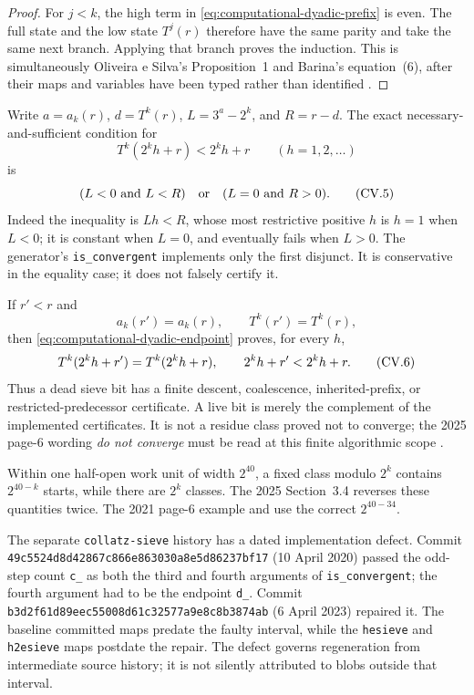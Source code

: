 \begin{proof}
For $j<k$, the high term in \eqref{eq:computational-dyadic-prefix} is even.
The full state and the low state $T^j(r)$ therefore have the same parity and
take the same next branch.  Applying that branch proves the induction.  This
is simultaneously Oliveira e Silva's Proposition~1 and Barina's equation~(6),
after their maps and variables have been typed rather than identified
\cite[p.~191]{OliveiraSilva2010}\cite[p.~5]{Barina2021}.
\end{proof}

Write $a=a_k(r)$, $d=T^k(r)$, $L=3^a-2^k$, and $R=r-d$.  The exact
necessary-and-sufficient condition for
\[
 T^k(2^kh+r)<2^kh+r\qquad(h=1,2,\ldots)
\]
is
\begin{equation}
\stepcounter{equation}
\label{eq:computational-uniform-descent}
 (L<0\text{ and }L<R)\quad\text{or}\quad(L=0\text{ and }R>0).
\tag{CV.5}
\end{equation}
Indeed the inequality is $Lh<R$, whose most restrictive positive $h$ is
$h=1$ when $L<0$; it is constant when $L=0$, and eventually fails when
$L>0$.  The generator's \texttt{is\_convergent} implements only the first
disjunct.  It is conservative in the equality case; it does not falsely
certify it.

If $r'<r$ and
\[
 a_k(r')=a_k(r),\qquad T^k(r')=T^k(r),
\]
then \eqref{eq:computational-dyadic-endpoint} proves, for every $h$,
\begin{equation}
\stepcounter{equation}
\label{eq:computational-endpoint-coalescence}
 T^k(2^kh+r')=T^k(2^kh+r),\qquad2^kh+r'<2^kh+r.
\tag{CV.6}
\end{equation}
Thus a dead sieve bit has a finite descent, coalescence, inherited-prefix, or
restricted-predecessor certificate.  A live bit is merely the complement of
the implemented certificates.  It is not a residue class proved not to
converge; the 2025 page-6 wording \emph{do not converge} must be read at this
finite algorithmic scope \cite{Barina2025}.

\begin{sourceissue}
\label{sourceissue:Barina-sieve-cardinality}
Within one half-open work unit of width $2^{40}$, a fixed class modulo
$2^k$ contains $2^{40-k}$ starts, while there are $2^k$ classes.  The 2025
Section~3.4 reverses these quantities twice.  The 2021 page-6 example and
 use the correct $2^{40-34}$.

The separate \texttt{collatz-sieve} history has a dated implementation
  defect.  Commit
  \nolinkurl{49c5524d8d42867c866e863030a8e5d86237bf17}
(10 April 2020) passed the odd-step count \texttt{c\_} as both the third and
fourth arguments of \texttt{is\_convergent}; the fourth argument had to be
the endpoint \texttt{d\_}.  Commit
  \nolinkurl{b3d2f61d89eec55008d61c32577a9e8c8b3874ab}
(6 April 2023) repaired it.  The baseline committed maps predate the faulty
interval, while the \texttt{hesieve} and \texttt{h2esieve} maps postdate the
repair.  The defect governs regeneration from intermediate source history;
it is not silently attributed to blobs outside that interval.
\end{sourceissue}

